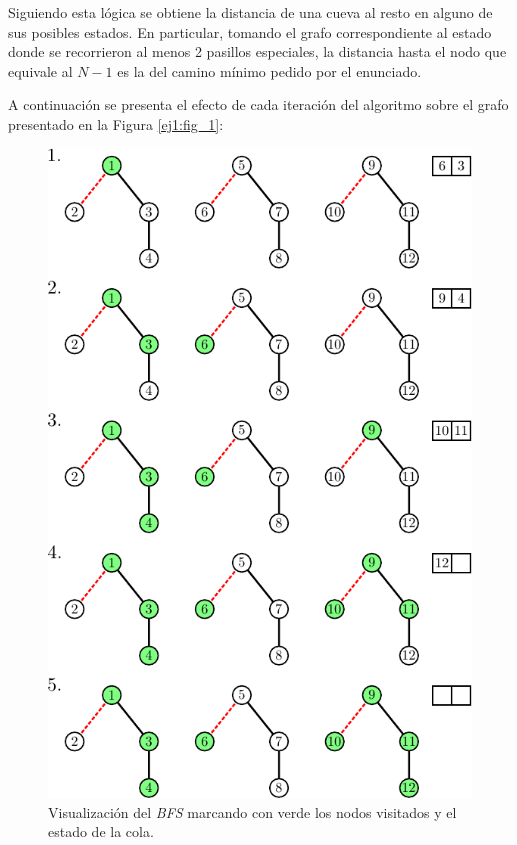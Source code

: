 	Siguiendo esta lógica se obtiene la distancia de una cueva al resto en
	alguno de sus posibles estados. En particular, tomando el grafo
	correspondiente al estado donde se recorrieron al menos 2 pasillos
	especiales, la distancia hasta el nodo que equivale al $N - 1$ es la del camino mínimo
	pedido por el enunciado.

	A continuación se presenta el efecto de cada iteración del algoritmo sobre el grafo
	presentado en la Figura \ref{ej1:fig_1}:

	\begin{figure}[H]
		\centering
		\includegraphics{imagenes/ej1_modelo_2.pdf}
		\caption{Visualización del \emph{BFS} marcando con verde los nodos
		visitados y el estado de la cola.}
		\label{ej1:bfs}
	\end{figure}

